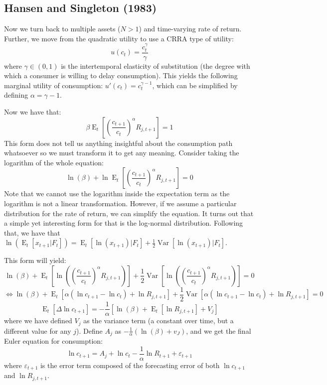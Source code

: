 \documentclass[12pt]{report}
\newcommand{\Et}[1]{\operatorname{E}_t\left[#1\right]}
\newcommand{\V}[1]{\operatorname{Var}\left[#1\right]}
\begin{document}
\subsection{Hansen and Singleton (1983)}

Now we turn back to multiple assets ($N>1$) and time-varying rate of return. Further, we move from the quadratic utility to use a CRRA type of utility: $$u(c_t) = \frac{c_t^\gamma}{\gamma} $$ where $\gamma \in (0,1)$ is the intertemporal elasticity of substitution (the degree with which a consumer is willing to delay consumption). This yields the following marginal utility of consumption: $u'(c_t) = c_t^{\gamma - 1}$, which can be simplified by defining $\alpha = \gamma - 1$.

Now we have that: $$\beta\Et{\left(\frac{c_{t+1}}{c_t}\right)^{\alpha} R_{j,t+1}} = 1 
$$ This form does not tell us anything insightful about the consumption path whatsoever so we must transform it to get any meaning. Consider taking the logarithm of the whole equation: $$\ln(\beta) + \ln\Et{\left(\frac{c_{t+1}}{c_t}\right)^{\alpha} R_{j,t+1}} = 0 $$ Note that we cannot use the logarithm inside the expectation term as the logarithm is not a linear transformation. However, if we assume a particular distribution for the rate of return, we can simplify the equation. It turns out that a simple yet interesting form for that is the log-normal distribution. Following that, we have that $\ln(\Et{x_{t+1}\vert F_{t}}) = \Et{\ln(x_{t+1})\vert F_t} + \frac{1}{2}\V{\ln(x_{t+1})\vert F_t} $.

This form will yield: $$\ln(\beta) + \Et{\ln\left(\left(\frac{c_{t+1}}{c_t}\right)^{\alpha} R_{j,t+1}\right)} + \frac{1}{2}\V{\ln\left(\left(\frac{c_{t+1}}{c_t}\right)^{\alpha} R_{j,t+1}\right)} = 0 $$ $$\Leftrightarrow \ln(\beta) + \Et{\alpha(\ln c_{t+1} - \ln c_t) + \ln R_{j,t+1}} + \frac{1}{2}\V{\alpha(\ln c_{t+1} - \ln c_t) + \ln R_{j,t+1}} = 0 $$ $$ \Et{\Delta\ln c_{t+1}} = -\frac{1}{\alpha} [\ln(\beta) +\Et{\ln R_{j,t+1}} + V_j] $$ where we have defined $V_j$ as the variance term (a constant over time, but a different value for any $j$). Define $A_j$ as $-\frac{1}{\alpha}(\ln(\beta) + v_J)$, and we get the final Euler equation for consumption: $$\ln c_{t+1} = A_j + \ln c_t - \frac{1}{\alpha} \ln R_{t+1} + \varepsilon_{t+1} $$ where $\varepsilon_{t+1}$ is the error term composed of the forecasting error of both $\ln c_{t+1}$ and $\ln R_{j,t+1}$. 
\end{document}
